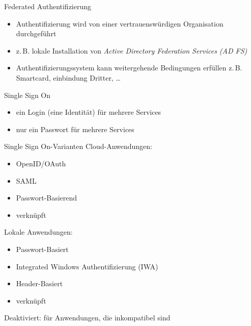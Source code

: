 
\begin{flashcard}[Definition]{Federated Authentifizierung}
    \begin{itemize}
        \item Authentifizierung wird von einer vertrauenswürdigen Organisation durchgeführt
        \item z.\,B. lokale Installation von \emph{Active Directory Federation Services (AD FS)}
        \item Authentifizierungssystem kann weitergehende Bedingungen erfüllen\newline
            z.\,B. Smartcard, einbindung Dritter, \ldots
    \end{itemize}
\end{flashcard}


\begin{flashcard}[Definition]{Single Sign On}
    \begin{itemize}
        \item ein Login (eine Identität) für mehrere Services
        \item nur ein Passwort für mehrere Services
    \end{itemize}
\end{flashcard}

\begin{flashcard}[Definition]{Single Sign On-Varianten}
    Cloud-Anwendungen:
    \begin{itemize}
        \item OpenID/OAuth
        \item SAML
        \item Passwort-Basierend
        \item verknüpft
    \end{itemize}
    Lokale Anwendungen:
    \begin{itemize}
        \item Passwort-Basiert
        \item Integrated Windows Authentifizierung (IWA)
        \item Header-Basiert
        \item verknüpft
    \end{itemize}
    Deaktiviert: für Anwendungen, die inkompatibel sind
\end{flashcard}

